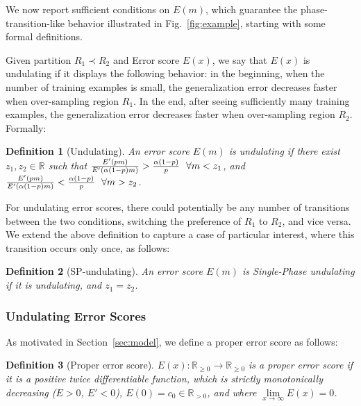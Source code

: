 \documentclass{article}
\newcommand{\R}{\mathbb{R}}
\newcommand{\pR}{1}\newcommand{\rR}{2}\newcommand{\prR}{i}
\newcommand{\psn}{\R_{\ge 0}}
\newcommand{\prn}{\R_{> 0}}
\newtheorem{defn}{Definition}
\begin{document}
We now report sufficient conditions on $E(m)$, which guarantee the phase-transition-like behavior illustrated in Fig.~\ref{fig:example}, starting with some formal definitions.

Given partition $R_\pR\prec R_\rR$ and Error score $E(x)$, we say that $E(x)$ is undulating if it displays the following behavior: in the beginning, when the number of training examples is small, the generalization error decreases faster when over-sampling region $R_\pR$. In the end, after seeing sufficiently many training examples, the generalization error decreases faster when  over-sampling region $R_\rR$. Formally: 
\begin{defn}[Undulating] An error score $E(m)$ is undulating if there exist $z_1,z_2\in\R$ such that  $\frac{E'\left(pm\right)}{E'\left(\alpha\left(1-p\right)m\right)}>\frac{\alpha\left(1-p\right)}{p}~~\forall m< z_1$, and $\frac{E'\left(pm\right)}{E'\left(\alpha\left(1-p\right)m\right)}<\frac{\alpha\left(1-p\right)}{p}~~\forall m> z_2$.
\label{def:1}
\end{defn}
For undulating error scores, there could potentially be any number of transitions between the two conditions, switching the preference of $R_\pR$ to $R_\rR$, and vice versa. We extend the above definition to capture a case of particular interest, where this transition occurs only once, as follows: 
\begin{defn}[SP-undulating] An error score $E(m)$ is Single-Phase undulating if it is undulating, and $z_1=z_2$.
\label{def:2}
\end{defn} 

\subsubsection{Undulating Error Scores}
As motivated in Section~\ref{sec:model}, we define a proper error score as follows:
\begin{defn}[Proper error score] $E(x):\psn\rightarrow\psn$ is a proper error score if it is a positive twice differentiable function, which is strictly monotonically decreasing ($E>0$, $E'<0$), $E(0)=c_0\in\prn$, and where $\lim\limits_{x\rightarrow\infty}E(x)=0$.
\label{def:proper}
\end{defn} 
\end{document}
